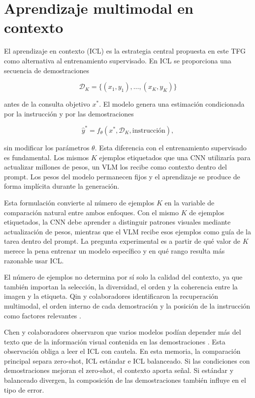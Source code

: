 \section{Aprendizaje multimodal en contexto}

El aprendizaje en contexto (ICL) es la estrategia central propuesta en este TFG como alternativa al entrenamiento supervisado. En ICL se proporciona una secuencia de demostraciones

\begin{equation}
\mathcal{D}_K =
\{(x_1,y_1),\ldots,(x_K,y_K)\}
\end{equation}

antes de la consulta objetivo \(x^\ast\). El modelo genera una estimación condicionada por la instrucción y por las demostraciones

\begin{equation}
\hat{y}^{\ast}
=
f_{\theta}
\left(
x^\ast,
\mathcal{D}_K,
\text{instrucción}
\right),
\end{equation}

sin modificar los parámetros \(\theta\). Esta diferencia con el entrenamiento supervisado es fundamental. Los mismos \(K\) ejemplos etiquetados que una CNN utilizaría para actualizar millones de pesos, un VLM los recibe como contexto dentro del prompt. Los pesos del modelo permanecen fijos y el aprendizaje se produce de forma implícita durante la generación.

Esta formulación convierte al número de ejemplos \(K\) en la variable de comparación natural entre ambos enfoques. Con el mismo \(K\) de ejemplos etiquetados, la CNN debe aprender a distinguir patrones visuales mediante actualización de pesos, mientras que el VLM recibe esos ejemplos como guía de la tarea dentro del prompt. La pregunta experimental es a partir de qué valor de \(K\) merece la pena entrenar un modelo específico y en qué rango resulta más razonable usar ICL.

El número de ejemplos no determina por sí solo la calidad del contexto, ya que también importan la selección, la diversidad, el orden y la coherencia entre la imagen y la etiqueta. Qin y colaboradores identificaron la recuperación multimodal, el orden interno de cada demostración y la posición de la instrucción como factores relevantes \cite{zhang2024mmicl}.

Chen y colaboradores observaron que varios modelos podían depender más del texto que de la información visual contenida en las demostraciones \cite{chen2024}. Esta observación obliga a leer el ICL con cautela. En esta memoria, la comparación principal separa zero-shot, ICL estándar e ICL balanceado. Si las condiciones con demostraciones mejoran el zero-shot, el contexto aporta señal. Si estándar y balanceado divergen, la composición de las demostraciones también influye en el tipo de error.

